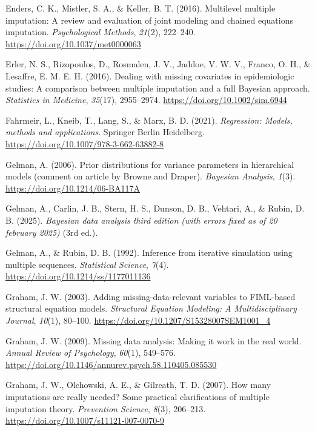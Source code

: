 \documentclass[
  letterpaper,
  11pt,
  english,
  singlespacing,
  headsepline,
  openany]{MastersDoctoralThesis}
\newlength{\cslhangindent}
\newenvironment{CSLReferences}[2] %
 {\begin{list}{}{%
  \setlength{\itemindent}{0pt}
  \setlength{\leftmargin}{0pt}
  \setlength{\parsep}{0pt}
  \ifodd #1
   \setlength{\leftmargin}{\cslhangindent}
   \setlength{\itemindent}{-1\cslhangindent}
  \fi
  \setlength{\itemsep}{#2\baselineskip}}}
 {\end{list}}
\begin{document}
\begin{CSLReferences}{1}{0}
Enders, C. K., Mistler, S. A., \& Keller, B. T. (2016). Multilevel
multiple imputation: A review and evaluation of joint modeling and
chained equations imputation. \emph{Psychological Methods},
\emph{21}(2), 222--240. \url{https://doi.org/10.1037/met0000063}

Erler, N. S., Rizopoulos, D., Rosmalen, J. V., Jaddoe, V. W. V., Franco,
O. H., \& Lesaffre, E. M. E. H. (2016). Dealing with missing covariates
in epidemiologic studies: A comparison between multiple imputation and a
full {Bayesian} approach. \emph{Statistics in Medicine}, \emph{35}(17),
2955--2974. \url{https://doi.org/10.1002/sim.6944}

Fahrmeir, L., Kneib, T., Lang, S., \& Marx, B. D. (2021).
\emph{Regression: {Models}, methods and applications}. Springer Berlin
Heidelberg. \url{https://doi.org/10.1007/978-3-662-63882-8}

Gelman, A. (2006). Prior distributions for variance parameters in
hierarchical models (comment on article by {Browne} and {Draper}).
\emph{Bayesian Analysis}, \emph{1}(3).
\url{https://doi.org/10.1214/06-BA117A}

Gelman, A., Carlin, J. B., Stern, H. S., Dunson, D. B., Vehtari, A., \&
Rubin, D. B. (2025). \emph{Bayesian data analysis third edition (with
errors fixed as of 20 february 2025)} (3rd ed.).

Gelman, A., \& Rubin, D. B. (1992). Inference from iterative simulation
using multiple sequences. \emph{Statistical Science}, \emph{7}(4).
\url{https://doi.org/10.1214/ss/1177011136}

Graham, J. W. (2003). Adding missing-data-relevant variables to
{FIML-based} structural equation models. \emph{Structural Equation
Modeling: A Multidisciplinary Journal}, \emph{10}(1), 80--100.
\url{https://doi.org/10.1207/S15328007SEM1001_4}

Graham, J. W. (2009). Missing data analysis: {Making} it work in the
real world. \emph{Annual Review of Psychology}, \emph{60}(1), 549--576.
\url{https://doi.org/10.1146/annurev.psych.58.110405.085530}

Graham, J. W., Olchowski, A. E., \& Gilreath, T. D. (2007). How many
imputations are really needed? {Some} practical clarifications of
multiple imputation theory. \emph{Prevention Science}, \emph{8}(3),
206--213. \url{https://doi.org/10.1007/s11121-007-0070-9}


\end{CSLReferences}
\end{document}
